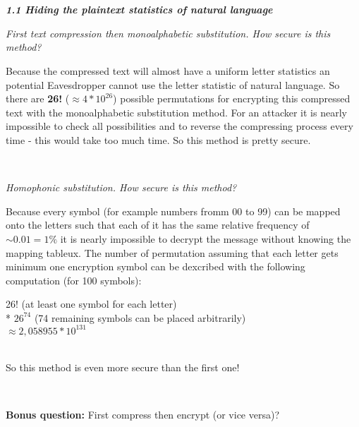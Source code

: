 \documentclass{article}
\begin{document}
	\pagestyle{fancy}
	\hfill \\ \\
	
	\textbf{\textit{1.1 Hiding the plaintext statistics of natural language}} \\
	\begin{compactenum}[a.)]
		\item \textit{First text compression then monoalphabetic substitution. How secure is this method?} \\
		\begin{compactenum}[{}]
			\item Because the compressed text will almost have a uniform letter statistics an potential Eavesdropper cannot use the letter statistic of natural language. So there are \textbf{26!} ($\approx 4*10^{26}$) possible permutations for encrypting this compressed text with the monoalphabetic substitution method. For an attacker it is nearly impossible to check all possibilities and to reverse the compressing process every time - this would take too much time. So this method is pretty secure.
		\end{compactenum}
		\hfill \\
		\item \textit{Homophonic substitution. How secure is this method?} \\
		\begin{compactenum}[{}]
			\item Because every symbol (for example numbers fromm 00 to 99) can be mapped onto the letters such that each of it has the same relative frequency of $\sim 0.01 = 1\%$ it is nearly impossible to decrypt the message without knowing the mapping tableux. The number of permutation assuming that each letter gets minimum one encryption symbol can be dexcribed with the following computation (for 100 symbols): \\
			\begin{center}			
			 26! (at least one symbol for each letter) \\
			 * $26^{74}$ (74 remaining symbols can be placed arbitrarily) \\
			 $\approx 2,058955 * 10^{131}$
			 \end{center}
			 \hfill \\
			 So this method is even more secure than the first one!
		\end{compactenum}
		\hfill \\
		\item \textbf{Bonus question:} First compress then encrypt (or vice versa)? \\

\end{compactenum}
\end{document}
